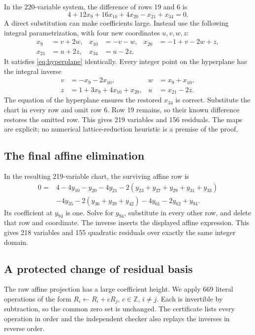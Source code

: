 \documentclass[11pt,letterpaper]{article}
\theoremstyle{definition}\newtheorem{definition}[theorem]{Definition}
\theoremstyle{remark}\newtheorem{remark}[theorem]{Remark}
\newcommand{\Z}{\mathbb Z}\newcommand{\N}{\mathbb N}
\begin{document}
In the 220-variable system, the difference of rows 19 and 6 is
\begin{equation}\label{eq:hyperplane}
 4+12x_9+16x_{10}+4x_{20}-x_{21}+x_{34}=0.
\end{equation}
A direct substitution can make coefficients large. Instead use the
following integral parametrization, with four new coordinates $u,v,w,z$:
\begin{align*}
 x_9&=v+2w,&x_{10}&=-v-w,&x_{20}&=-1+v-2w+z,\\
 x_{21}&=u+2z,&x_{34}&=u-2z.
\end{align*}
It satisfies \eqref{eq:hyperplane} identically. Every integer point on
the hyperplane has the integral inverse
\begin{align*}
 v&=-x_9-2x_{10},&w&=x_9+x_{10},\\
 z&=1+3x_9+4x_{10}+x_{20},&u&=x_{21}-2z.
\end{align*}
The equation of the hyperplane ensures the restored $x_{34}$ is correct.
Substitute the chart in every row and omit row 6. Row 19 remains, so their
known difference restores the omitted row. This gives 219 variables and
156 residuals. The maps are explicit; no numerical lattice-reduction
heuristic is a premise of the proof.

\subsection{The final affine elimination}

In the resulting 219-variable chart, the surviving affine row is
\begin{align*}
0={}&4-4y_{10}-y_{20}-4y_{21}
 -2(y_{23}+y_{27}+y_{29}+y_{31}+y_{33})\\
&-4y_{35}-2(y_{36}+y_{39}+y_{42})-4y_{61}-2y_{62}+y_{94}.
\end{align*}
Its coefficient at $y_{94}$ is one. Solve for $y_{94}$, substitute in
every other row, and delete that row and coordinate. The inverse inserts
the displayed affine expression. This gives 218 variables and 155
quadratic residuals over exactly the same integer domain.

\subsection{A protected change of residual basis}

The raw affine projection has a large coefficient height. We apply 669
literal operations of the form $R_i\leftarrow R_i+cR_j$, $c\in\Z$,
$i\ne j$. Each is invertible by subtraction, so the common zero set is
unchanged. The certificate lists every operation in order and the
independent checker also replays the inverses in reverse order.
\end{document}
